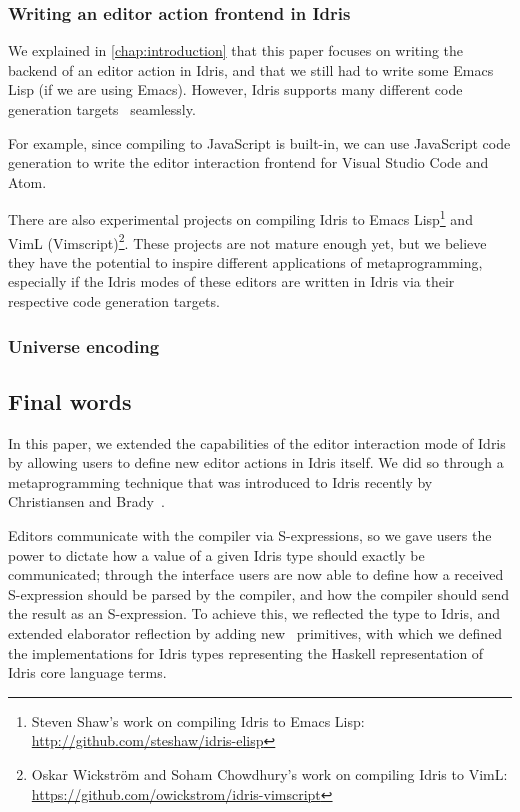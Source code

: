 \subsubsection{Writing an editor action frontend in Idris}

We explained in \autoref{chap:introduction} that this paper focuses on writing
the backend of an editor action in Idris, and that we still had to write some
Emacs Lisp (if we are using Emacs). However, Idris supports many different
code generation targets~\cite{idriscodegen} seamlessly.

For example, since compiling to JavaScript is built-in, we can use JavaScript
code generation to write the editor interaction frontend for Visual Studio Code
and Atom.

There are also experimental projects on compiling Idris to Emacs
Lisp\footnote{Steven Shaw's work on compiling Idris to Emacs Lisp:
\url{http://github.com/steshaw/idris-elisp}} and VimL
(Vimscript)\footnote{Oskar Wickstr\"om and Soham Chowdhury's work on
compiling Idris to VimL:
\url{https://github.com/owickstrom/idris-vimscript}}. These projects are not
mature enough yet, but we believe they have the potential to inspire different
applications of metaprogramming, especially if the Idris modes of these editors
are written in Idris via their respective code generation targets.

\subsubsection{Universe encoding}


\subsection{Final words}

In this paper, we extended the capabilities of the editor interaction mode of
Idris by allowing users to define new editor actions in Idris itself. We did
so through a metaprogramming technique that was introduced to Idris recently by
Christiansen and Brady~\cite{elabref}.

Editors communicate with the compiler via S-expressions, so we gave users the
power to dictate how a value of a given Idris type should exactly be
communicated; through the  interface users are now able to
define how a received S-expression should be parsed by the compiler, and how
the compiler should send the result as an S-expression. To achieve this, we
reflected the  type to Idris, and extended elaborator reflection
by adding new \Elab\ primitives, with which we defined the 
implementations for Idris types representing the Haskell representation of
Idris core language terms.


